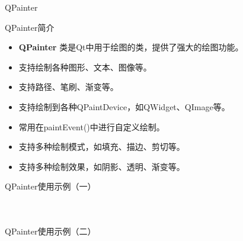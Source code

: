 \documentclass[UTF8,aspectratio=169]{beamer}
\begin{document}
\begin{frame}{QPainter}
    \begin{ytublock}{QPainter简介}
        \begin{itemize}
            \item \textbf{QPainter} 类是Qt中用于绘图的类，提供了强大的绘图功能。
            \item 支持绘制各种图形、文本、图像等。
            \item 支持路径、笔刷、渐变等。
            \item 支持绘制到各种QPaintDevice，如QWidget、QImage等。
            \item 常用在paintEvent()中进行自定义绘制。
            \item 支持多种绘制模式，如填充、描边、剪切等。
            \item 支持多种绘制效果，如阴影、透明、渐变等。
        \end{itemize}
    \end{ytublock}
\end{frame}

\begin{frame}[fragile]{QPainter使用示例（一）}
    \begin{columns}
        \begin{column}{0.48\textwidth}
            \inputminted[firstline=1,lastline=19]{cpp}{code/qt_painter_example.cpp}
        \end{column}
        \begin{column}{0.48\textwidth}
            \inputminted[firstline=20,lastline=35]{cpp}{code/qt_painter_example.cpp}
        \end{column}
    \end{columns}
\end{frame}

\begin{frame}[fragile]{QPainter使用示例（二）}
    \begin{columns}
        \begin{column}{0.48\textwidth}
            \inputminted[firstline=36,lastline=54]{cpp}{code/qt_painter_example.cpp}
        \end{column}
        \begin{column}{0.48\textwidth}
            \inputminted[firstline=55,lastline=71]{cpp}{code/qt_painter_example.cpp}
        \end{column}
    \end{columns}
\end{frame}
\end{document}
